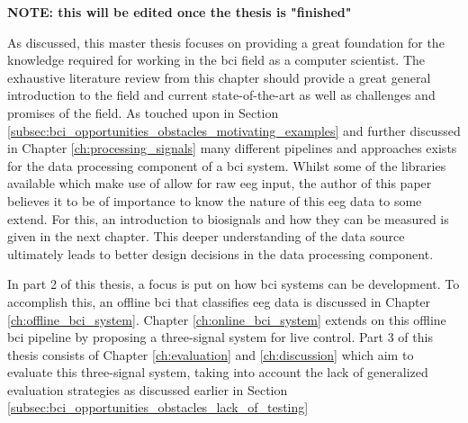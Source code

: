 

\textbf{NOTE: this will be edited once the thesis is "finished"}

As discussed, this master thesis focuses on providing a great foundation for the knowledge required for working in the \gls{bci} field as a computer scientist.
The exhaustive literature review from this chapter should provide a great general introduction to the field and current state-of-the-art as well as challenges and promises of the field.
As touched upon in Section \ref{subsec:bci_opportunities_obstacles_motivating_examples} and further discussed in Chapter \ref{ch:processing_signals} many different pipelines and approaches exists for the data processing component of a \gls{bci} system.
Whilst some of the libraries available which make use of  allow for raw \gls{eeg} input, the author of this paper believes it to be of importance to know the nature of this \gls{eeg} data to some extend.
For this, an introduction to \glspl{biosignal} and how they can be measured is given in the next chapter.
This deeper understanding of the data source ultimately leads to better design decisions in the data processing component.

In part 2 of this thesis, a focus is put on how \gls{bci} systems can be development.
To accomplish this, an offline \gls{bci} that classifies \gls{eeg} data is discussed in Chapter \ref{ch:offline_bci_system}.
Chapter \ref{ch:online_bci_system} extends on this offline \gls{bci} pipeline by proposing a three-signal system for live control.
Part 3 of this thesis consists of Chapter \ref{ch:evaluation} and \ref{ch:discussion} which aim to evaluate this three-signal system, taking into account the lack of generalized evaluation strategies as discussed earlier in Section \ref{subsec:bci_opportunities_obstacles_lack_of_testing}